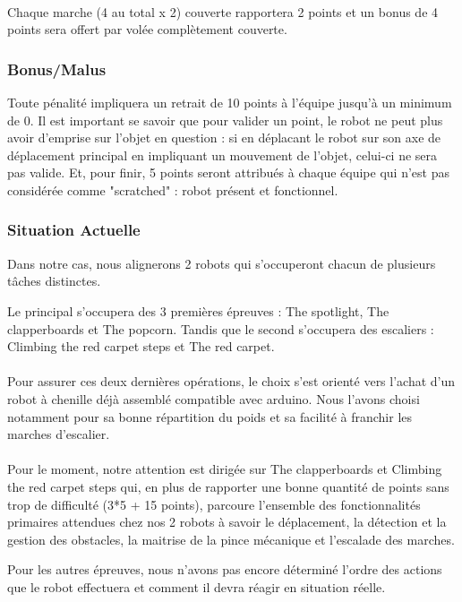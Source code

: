 \paragraph{}
Chaque marche (4 au total x 2) couverte rapportera 2 points et un bonus de 4 points sera offert par volée complètement couverte.

\subsubsection{Bonus/Malus}
Toute pénalité impliquera un retrait de 10 points à l'équipe jusqu'à un minimum de 0.
\noindent Il est important se savoir que pour valider un point, le robot ne peut plus avoir d'emprise sur l'objet en question : si en déplacant le robot sur son axe de déplacement principal en impliquant un mouvement de l'objet, celui-ci ne sera pas valide.
\noindent Et, pour finir, 5 points seront attribués à chaque équipe qui n'est pas considérée comme "scratched" : robot présent et fonctionnel.

\subsubsection{Situation Actuelle}
Dans notre cas, nous alignerons 2 robots qui s'occuperont chacun de plusieurs tâches distinctes. 

\noindent Le principal s'occupera des 3 premières épreuves : The spotlight, The clapperboards et The popcorn. Tandis que le second s’occupera des escaliers : Climbing the red carpet steps et The red carpet.

\paragraph{}
Pour assurer ces deux dernières opérations, le choix s’est orienté vers l’achat d’un robot à chenille déjà assemblé compatible avec arduino. Nous l’avons choisi notamment pour sa bonne répartition du poids et sa facilité à franchir les marches d’escalier.  

\paragraph{}
Pour le moment, notre attention est dirigée sur The clapperboards et Climbing the red carpet steps qui, en plus de rapporter une bonne quantité de points sans trop de difficulté (3*5 + 15 points), parcoure l'ensemble des fonctionnalités primaires attendues chez nos 2 robots à savoir le déplacement, la détection et la gestion des obstacles, la maitrise de la pince mécanique et l'escalade des marches.

\noindent Pour les autres épreuves, nous n’avons pas encore déterminé l’ordre des actions que le robot effectuera et comment il devra réagir en situation réelle.
